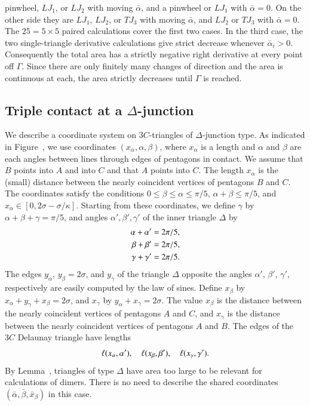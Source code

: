 pinwheel, $LJ_1$, or $LJ_2$ with moving $\bar\alpha$, and a pinwheel
or $LJ_1$ with $\bar\alpha=0$. On the other side they are $LJ_1$,
$LJ_2$, or $TJ_3$ with moving $\bar\alpha$, and $LJ_2$ or $TJ_3$ with
$\bar\alpha=0$. The $25=5\times5$ paired calculations cover the first
two cases. In the third case, the two
single-triangle derivative calculations give strict decrease
whenever $\bar\alpha_i>0$. Consequently the total area has a
strictly negative right derivative at every point off $\Gamma$.
Since there are only finitely many changes of direction and the
area is continuous at each, the area strictly decreases until
$\Gamma$ is reached.

\subsection{Triple contact at a $\Delta$-junction}

We describe a coordinate system on $3C$-triangles of $\Delta$-junction
type.  As indicated in Figure~, we use coordinates
$(x_\alpha,\alpha,\beta)$, where $x_\alpha$ is a length and $\alpha$
and $\beta$ are each angles between lines through edges of pentagons
in contact.  We assume that $B$ points into $A$ and into $C$ and that
$A$ points into $C$. The length $x_\alpha$ is the (small) distance
between the nearly coincident vertices of pentagons $B$ and $C$.  The
coordinates satisfy the conditions $0\le\beta\le\alpha\le\pi/5$,
$\alpha+\beta\le \pi/5$, and $x_\alpha\in[0, 2\sigma -
\sigma/\kappa]$.  Starting from these coordinates, we define $\gamma$
by $\alpha+\beta+\gamma=\pi/5$, and angles $\alpha',\beta',\gamma'$ of
the inner triangle $\Delta$ by
\begin{align}\libel{eqn:abc}
\alpha+\alpha' &= 2\pi/5,\\
\beta+\beta' &= 2\pi/5,\nonumber\\
\gamma+\gamma' &= 2\pi/5.\nonumber
\end{align}
The edges $y_\alpha$, $y_\beta = 2\sigma$, and $y_\gamma$ of the
triangle $\Delta$ opposite the angles $\alpha'$, $\beta'$, $\gamma'$,
respectively are easily computed by the law of sines.  Define
$x_\beta$ by $x_\alpha+y_\gamma+x_\beta=2\sigma$, and $x_\gamma$ by
$y_\alpha+x_\gamma=2\sigma$.  The value $x_\beta$ is the distance
between the nearly coincident vertices of pentagons $A$ and $C$, and
$x_\gamma$ is the distance between the nearly coincident vertices of
pentagons $A$ and $B$.  The edges of the $3C$ Delaunay triangle have
lengths
\[
\ell(x_\alpha,\alpha'),\quad \ell(x_\beta,\beta'),\quad \ell(x_\gamma,\gamma').
\]
By Lemma~, triangles of type $\Delta$ have area too
large to be relevant for calculations of dimers.  There is no need to
describe the shared coordinates $(\bar \alpha,\bar\beta,\bar x_\beta)$
in this case.


